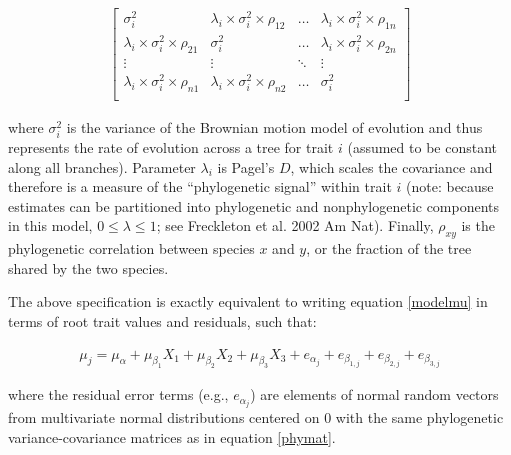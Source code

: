 \documentclass[12pt,a4paper]{article}
\begin{document}
\begin{align}
  \label{phymat}
\begin{bmatrix}
  \sigma^2_i & \lambda_i \times \sigma^2_{i} \times \rho_{12} & \ldots & \lambda_i \times \sigma^2_{i} \times \rho_{1n} \\
  \lambda_i \times \sigma^2_i \times \rho_{21} & \sigma^2_i & \ldots & \lambda_i \times \sigma^2_{i} \times \rho_{2n} \\
  \vdots & \vdots & \ddots & \vdots \\
  \lambda_i \times \sigma^2_i \times \rho_{n1} & \lambda_i \times \sigma^2_i \times \rho_{n2} & \ldots & \sigma^2_i \\
\end{bmatrix}
\end{align}

where $\sigma_i^2$ is the variance of the Brownian motion model of evolution and thus represents the rate of evolution across a tree for trait $i$ (assumed to be constant along all branches). Parameter $\lambda_i$ is Pagel's $D$, which scales the covariance and therefore is a measure of the ``phylogenetic signal'' within trait $i$ (note: because estimates can be partitioned into phylogenetic and nonphylogenetic components in this model, $0 \leq \lambda \leq 1$; see Freckleton et al. 2002 Am Nat). Finally, $\rho_{xy}$ is the phylogenetic correlation between species $x$ and $y$, or the fraction of the tree shared by the two species.

The above specification is exactly equivalent to writing equation \ref{modelmu} in terms of root trait values and residuals, such that:

\begin{align}
  \mu_j = \mu_\alpha + \mu_{\beta_1} X_1 + \mu_{\beta_2} X_2 + \mu_{\beta_3} X_3 + e_{\alpha_{j}} + e_{\beta_{1,j}} + e_{\beta_{2,j}} + e_{\beta_{3,j}}
\end{align}

\noindent where the residual error terms (e.g., $e_{\alpha_{j}}$) are elements of normal random vectors from multivariate normal distributions centered on $0$ with the same phylogenetic variance-covariance matrices as in equation \ref{phymat}.
\end{document}
